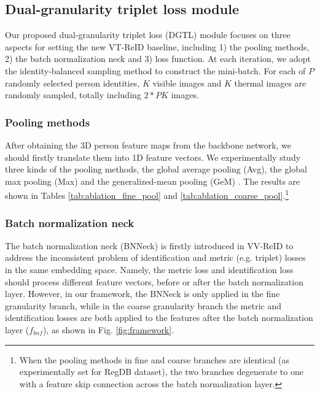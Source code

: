 \documentclass[journal]{IEEEtran}
\begin{document}
\subsection{Dual-granularity triplet loss module}
Our proposed dual-granularity triplet loss (DGTL) module focuses on three aspects for setting the new VT-ReID baseline, including 1) the pooling methods, 2) the batch normalization neck and 3) loss function.
At each iteration, we adopt the identity-balanced sampling method \cite{ye2020vipr,Liu2020ParametersSE} to construct the mini-batch. For each of $P$ randomly selected person identities, $K$ visible images and $K$ thermal images are randomly sampled, totally including $2*PK$ images.

\subsubsection{Pooling methods}
After obtaining the 3D person feature maps from the backbone network, we should firstly translate them into 1D feature vectors. We experimentally study three kinds of the pooling methods, the global average pooling (Avg), the global max pooling (Max) and the generalized-mean pooling (GeM) \cite{radenovic2018fine}. The results are shown in Tables \ref{tab:ablation_fine_pool} and \ref{tab:ablation_coarse_pool}.\footnote{When the pooling methods in fine and coarse branches are identical (as experimentally set for RegDB dataset), the two branches degenerate to one with a feature skip connection across the batch normalization layer.}

\subsubsection{Batch normalization neck}
The batch normalization neck (BNNeck) \cite{Luo2019ASB} is firstly introduced in VV-ReID to address the inconsistent problem of identification and metric (e.g. triplet) losses in the same embedding space. Namely, the metric loss and identification loss should process different feature vectors, before or after the batch normalization layer. However, in our framework, the BNNeck is only applied in the fine granularity branch, while in the coarse granularity branch the metric and identification losses are both applied to the features after the batch normalization layer ($f_{bnf}$), as shown in Fig. \ref{fig:framework}.
\end{document}
